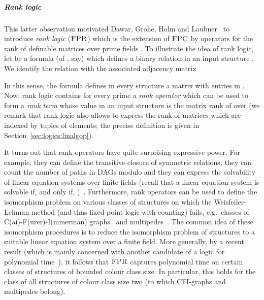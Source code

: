 \documentclass[a4paper,UKenglish]{lipics}
\newcommand{\logic}[1]{\ensuremath{\textsc{#1}}\xspace}
\newcommand{\FPC}{\logic{FPC}}
\newcommand{\FPRK}{\logic{FPR}}
\newcommand{\FPR}{\FPRK}
\theoremstyle{plain}
\begin{document}
\subparagraph*{Rank logic}
This latter observation motivated Dawar, Grohe, Holm and 
Laubner~\cite{DaGrHoLa09} 
to introduce \emph{rank logic} (\FPR) which is the extension of \FPC by 
operators for the rank of definable matrices over prime 
fields .
To illustrate the idea of rank logic, let
 be a formula (of , say) which defines a binary 
relation  in an input structure .
We identify the relation  with the associated adjacency matrix 

In this sense, the formula  defines in every structure  a 
matrix  with entries in . 
Now, rank logic  contains for every prime 
 a \emph{rank operator}  which can be used to form a 
\emph{rank term}  whose value in an input structure 
 is 
the matrix rank of  over  (we remark that rank logic 
also allows to express the rank of matrices which are indexed by tuples of 
elements; the precise definition is given in Section~\ref{sec:logics:linalgop}).

It turns out that rank operators have quite surprising expressive power. 
For example, they can define the transitive closure of symmetric 
relations, they can count the number of paths in DAGs modulo  and they 
can express the solvability of linear equation systems over finite fields 
(recall that a linear equation system  is solvable if, 
and only if, )~\cite{DaGrHoLa09}. 
Furthermore, rank operators can be used to define the isomorphism problem on
various classes of structures on which the Weisfeiler-Lehman method (and thus 
fixed-point logic with counting) fails, e.g.\ classes of
C(ai)-F(ürer)-I(mmerman) graphs~\cite{CFI92,DaGrHoLa09} and 
multipedes~\cite{GuSh96,Ho10}.
The common idea of these isomorphism procedures is to reduce the isomorphism 
problem of structures to a suitable linear equation system over a finite field.
More generally, by a recent result (which is mainly concerned with another 
candidate of a logic for polynomial time~\cite{AGGP14}), it follows that \FPR 
captures polynomial time on certain classes of structures of bounded colour 
class size. In particular, this holds for the class of all structures of colour 
class size two (to which CFI-graphs and multipedes belong).
\end{document}
